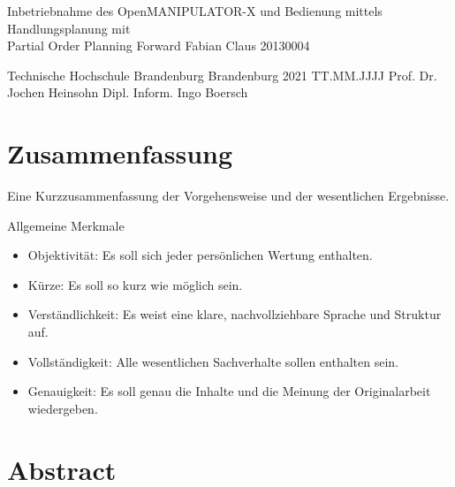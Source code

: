 




  \JMUTitle
      {Inbetriebnahme des OpenMANIPULATOR-X und Bedienung mittels Handlungsplanung mit\\ Partial Order Planning Forward}        %
      {Fabian Claus}                        %
      {20130004}
      
      {Technische Hochschule Brandenburg}  %
      {Brandenburg 2021}                          %
      {TT.MM.JJJJ}                              %
      {Prof. Dr. Jochen Heinsohn}               %
      {Dipl. Inform. Ingo Boersch}                          %

  \clearpage

\lhead{}
    \setcounter{page}{1}

\tableofcontents
\clearpage

\section*{Zusammenfassung}

Eine Kurzzusammenfassung der Vorgehensweise und der wesentlichen Ergebnisse.

Allgemeine Merkmale
\begin{itemize}
    \item Objektivität: Es soll sich jeder persönlichen Wertung enthalten.
    \item Kürze: Es soll so kurz wie möglich sein.
    \item Verständlichkeit: Es weist eine klare, nachvollziehbare Sprache und Struktur auf.
    \item Vollständigkeit: Alle wesentlichen Sachverhalte sollen enthalten sein.
    \item Genauigkeit: Es soll genau die Inhalte und die Meinung der Originalarbeit wiedergeben.
\end{itemize}{}

\newpage
{}
\section*{Abstract}

